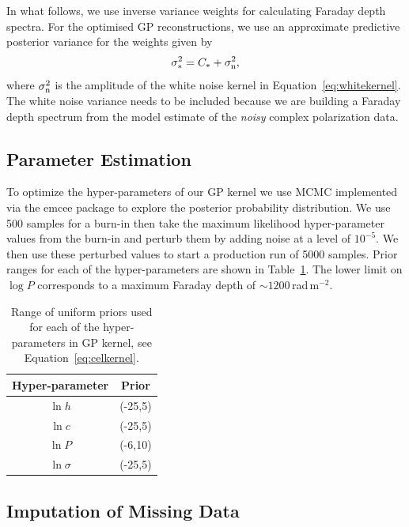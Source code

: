 \documentclass[fleqn,usenatbib]{mnras}
\begin{document}
In what follows, we use inverse variance weights for calculating Faraday depth spectra. For the optimised GP reconstructions, we use an approximate predictive posterior variance for the weights given by
%
\begin{equation}
\label{eq:gpvar}
\sigma_{\ast}^2 = C_{\ast} + \sigma_{\rm n}^2,
\end{equation}
%
\citep{3569} where $\sigma_{\rm n}^2$ is the amplitude of the white noise kernel in Equation~\ref{eq:whitekernel}. The white noise variance needs to be included because we are building a Faraday depth spectrum from the model estimate of the {\it noisy} complex polarization data.

\subsection{Parameter Estimation}
\label{sec:optimization}

To optimize the hyper-parameters of our GP kernel we use MCMC implemented via the {\sc emcee} package \citep{emcee} to explore the posterior probability distribution. We use 500 samples for a burn-in then take the maximum likelihood hyper-parameter values from the burn-in and perturb them by adding noise at a level of $10^{-5}$. We then use these perturbed values to start a production run of 5000 samples. Prior ranges for each of the hyper-parameters are shown in Table~\ref{tab:priors}. The lower limit on $\log P$ corresponds to a maximum Faraday depth of $\sim1200$\,rad\,m$^{-2}$.
%
\begin{table}
\caption{\label{tab:priors} Range of uniform priors used for each of the hyper-parameters in GP kernel, see Equation~\ref{eq:celkernel}.}
\centering
\begin{tabular}{|c|c|}
\hline
Hyper-parameter & Prior \\\hline
$\ln h$ & (-25,5)\\
$\ln c$ & (-25,5)\\
$\ln P$ & (-6,10)\\
$\ln \sigma$ & (-25,5)\\\hline
\end{tabular}
\end{table}


\subsection{Imputation of Missing Data}
\label{sec:missing}
\end{document}

